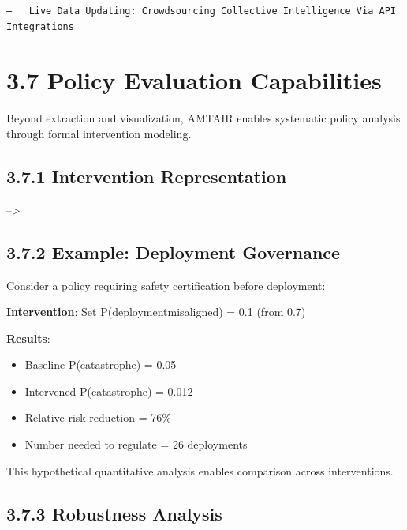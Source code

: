 \documentclass[
  11pt,
  letterpaper,
]{book}
\providecommand{\tightlist}{%
  \setlength{\itemsep}{0pt}\setlength{\parskip}{0pt}}
\begin{document}
\begin{verbatim}
—   Live Data Updating: Crowdsourcing Collective Intelligence Via API Integrations
\end{verbatim}

\section*{3.7 Policy Evaluation
Capabilities}\label{sec-policy-evaluation}


Beyond extraction and visualization, AMTAIR enables systematic policy
analysis through formal intervention modeling.

\subsection*{3.7.1 Intervention
Representation}\label{sec-intervention-representation}

--\textgreater{}

\subsection*{3.7.2 Example: Deployment
Governance}\label{sec-deployment-example}

Consider a policy requiring safety certification before deployment:

\textbf{Intervention}: Set P(deployment\textbar misaligned) = 0.1 (from
0.7)

\textbf{Results}:

\begin{itemize}
\tightlist
\item
  Baseline P(catastrophe) = 0.05
\item
  Intervened P(catastrophe) = 0.012
\item
  Relative risk reduction = 76\%
\item
  Number needed to regulate = 26 deployments
\end{itemize}

This hypothetical quantitative analysis enables comparison across
interventions.

\subsection*{3.7.3 Robustness Analysis}\label{sec-robustness}
\end{document}

